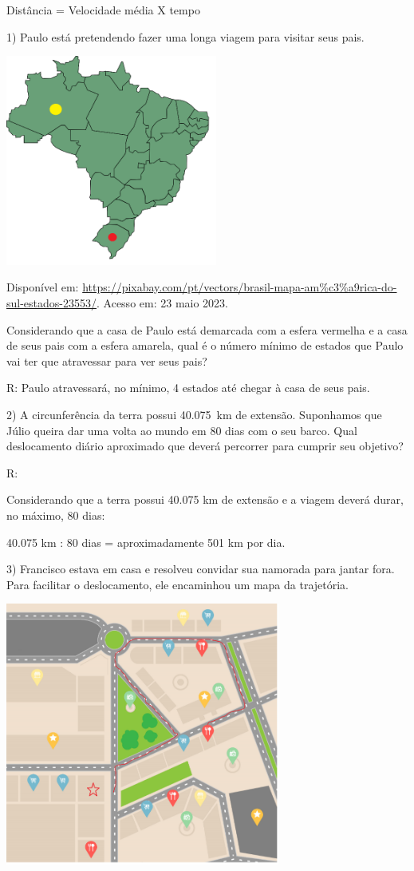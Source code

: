 Distância = Velocidade média X tempo


1) Paulo está pretendendo fazer uma longa viagem para visitar seus pais.

\includegraphics[width=2.73952in,height=2.725in]{./imgSAEB_8_MAT/media/image36.png}

Disponível em:
\url{https://pixabay.com/pt/vectors/brasil-mapa-am\%c3\%a9rica-do-sul-estados-23553/}.
Acesso em: 23 maio 2023.

Considerando que a casa de Paulo está demarcada com a esfera vermelha e
a casa de seus pais com a esfera amarela, qual é o número mínimo de
estados que Paulo vai ter que atravessar para ver seus pais?

R: Paulo atravessará, no mínimo, 4 estados até chegar à casa de seus
pais.

2) A circunferência da terra possui 40.075~km de extensão. Suponhamos
que Júlio queira dar uma volta ao mundo em 80 dias com o seu barco. Qual
deslocamento diário aproximado que deverá percorrer para cumprir seu
objetivo?

R:

Considerando que a terra possui 40.075 km de extensão e a viagem deverá
durar, no máximo, 80 dias:

40.075 km : 80 dias = aproximadamente 501 km por dia.

3) Francisco estava em casa e resolveu convidar sua namorada para jantar
fora. Para facilitar o deslocamento, ele encaminhou um mapa da
trajetória.

\includegraphics[width=3.55in,height=3.406in]{./imgSAEB_8_MAT/media/image37.png}

